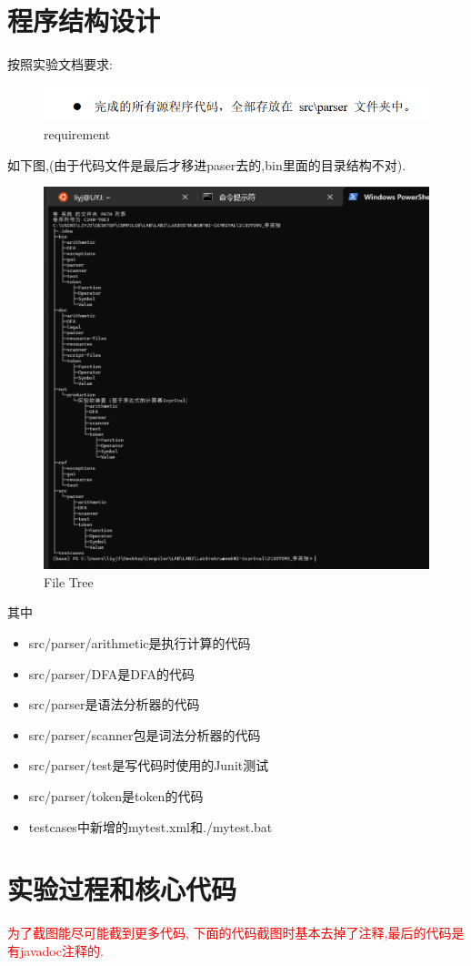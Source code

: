 \documentclass{article}
\begin{document}
\section{程序结构设计}
按照实验文档要求:
\begin{figure}[H]
    \centering
    \includegraphics[width=0.5\linewidth]{image23.png}
    \caption{requirement}
    \label{fig:image23}
\end{figure}
如下图,(由于代码文件是最后才移进paser去的,bin里面的目录结构不对).
\begin{figure}[H]
    \centering
    \includegraphics[width=0.7\linewidth]{image22.png}
    \caption{File Tree}
    \label{fig:image22}
\end{figure}
其中
\begin{itemize}
    \item src/parser/arithmetic是执行计算的代码
    \item src/parser/DFA是DFA的代码
    \item src/parser是语法分析器的代码
    \item src/parser/scanner包是词法分析器的代码
    \item src/parser/test是写代码时使用的Junit测试
    \item src/parser/token是token的代码
    \item testcases中新增的mytest.xml和./mytest.bat
\end{itemize}
\newpage
\section{实验过程和核心代码}
\textcolor{red}{为了截图能尽可能截到更多代码, 下面的代码截图时基本去掉了注释,最后的代码是有javadoc注释的.}
\end{document}
